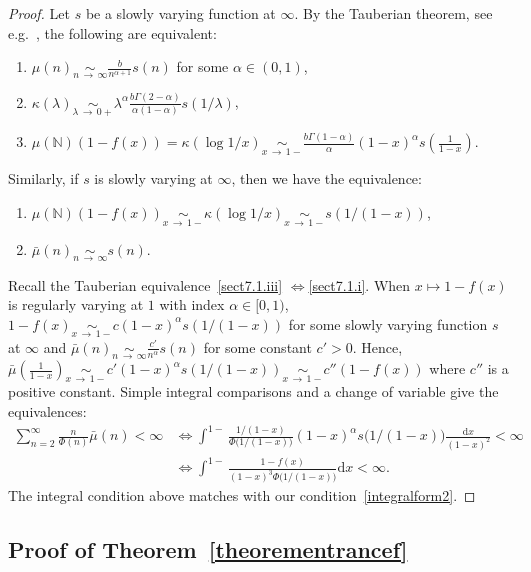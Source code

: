 \documentclass[10pt]{amsart}
\theoremstyle{definition}\newtheorem{defi}[theo]{Definition}\newtheorem{rema}[theo]{Remark}\newtheorem{exam}[theo]{Example}\newtheorem{exem}[theo]{Example}\newtheorem{nota}[theo]{Notation}
\newcommand{\ddr}{\mathrm{d}}
\newcommand{\bbN}{\mathbb{N}}
\newcommand*{\romanenumi}{\renewcommand*{\theenumi}{\roman{enumi}}}
\begin{document}
\begin{proof}
Let $s$ be a slowly varying function at $\infty$. By the Tauberian theorem, see e.g.~\cite[Chapter~0.7 page~10]{Bertoin96}, the following are equivalent:
\begin{enumerate}\romanenumi
\item\label{sect7.1.i} $\mu(n)\underset{n\,\rightarrow\,\infty}{\sim} \frac{b }{n^{\alpha+1}}s(n)$ for some $\alpha\in (0,1)$,
\item\label{sect7.1.ii} $\kappa(\lambda)\underset{\lambda\,\rightarrow\,0+}{\sim} \lambda^{\alpha}\frac{b\Gamma(2-\alpha)}{\alpha(1-\alpha)}s(1/\lambda)$,
\item\label{sect7.1.iii} $\mu(\bbN)(1-f(x))=\kappa(\log 1/x)\underset{x\,\rightarrow\,1-}{\sim} \frac{b\Gamma(1-\alpha)}{\alpha}(1-x)^{\alpha}s(\frac{1}{1-x}).$
\end{enumerate}
Similarly, if $s$ is slowly varying at $\infty$, then we have the equivalence:
\begin{enumerate}
\item $\mu(\bbN)(1-f(x))\underset{x\,\rightarrow\,1-}{\sim}\kappa(\log 1/x)\underset{x\,\rightarrow\,1-}{\sim} s(1/(1-x))$,
\item $\bar{\mu}(n)\underset{n\,\rightarrow\,\infty}{\sim} s(n)$.
\end{enumerate}
Recall the Tauberian equivalence~\eqref{sect7.1.iii} $\Longleftrightarrow$\eqref{sect7.1.i}. When $x\mapsto 1-f(x)$ is regularly varying at $1$ with index $\alpha\in [0,1)$, $1-f(x)\underset{x\,\rightarrow\,1-}{\sim} c(1-x)^{\alpha}s(1/(1-x))$ for some slowly varying function $s$ at $\infty$ and $\bar{\mu}(n)\underset{n\,\rightarrow\,\infty}{\sim} \frac{c'}{n^{\alpha}}s(n)$ for some constant $c'>0$. Hence, $\bar{\mu}(\frac{1}{1-x})\underset{x\,\rightarrow\,1-}{\sim} c'(1-x)^{\alpha}s(1/(1-x)) \underset{x\,\rightarrow\,1-}{\sim} c'' (1-f(x))$ where $c''$ is a positive constant. Simple integral comparisons and a change of variable give the equivalences:
\begin{align*}
\sum_{n=2}^{\infty}\frac{n}{\Phi(n)}\bar{\mu}(n)<\infty &\Longleftrightarrow \int^{1-}\frac{1/(1-x)}{\Phi\big(1/(1-x)\big)} (1-x)^{\alpha}s\big(1/(1-x)\big)\frac{\ddr x}{(1-x)^2}<\infty \\
&\Longleftrightarrow \int^{1-}\frac{1-f(x)}{(1-x)^3\Phi\big(1/(1-x)\big)} \ddr x<\infty.
\end{align*}
The integral condition above matches with our condition~\eqref{integralform2}.
\end{proof}


\subsection{Proof of Theorem~\ref{theorementrancef}}
\end{document}
